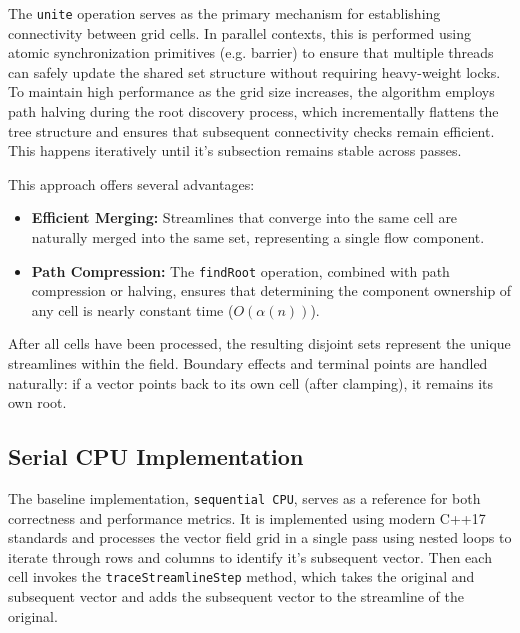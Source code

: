 The \texttt{unite} operation serves as the primary mechanism for establishing connectivity between grid cells.
In parallel contexts, this is performed using atomic synchronization primitives (e.g. barrier) to ensure that multiple threads can safely update the shared set structure without requiring heavy-weight locks.
To maintain high performance as the grid size increases, the algorithm employs path halving during the root discovery process, which incrementally flattens the tree structure and ensures that subsequent connectivity checks remain efficient.
This happens iteratively until it's subsection remains stable across passes.


This approach offers several advantages:
\begin{itemize}
	\item \textbf{Efficient Merging:} Streamlines that converge into the same cell are naturally merged into the same set, representing a single flow component.
	\item \textbf{Path Compression:} The \texttt{findRoot} operation, combined with path compression or halving, ensures that determining the component ownership of any cell is nearly constant time ($O(\alpha(n))$).
\end{itemize}

After all cells have been processed, the resulting disjoint sets represent the unique streamlines within the field.
Boundary effects and terminal points are handled naturally: if a vector points back to its own cell (after clamping), it remains its own root.

\subsection{Serial CPU Implementation}
The baseline implementation, \texttt{sequential CPU}, serves as a reference for both correctness and performance metrics.
It is implemented using modern C++17 standards and processes the vector field grid in a single pass using nested loops to iterate through rows and columns to identify it's subsequent vector.
Then each cell invokes the \texttt{traceStreamlineStep} method, which takes the original and subsequent vector and adds the subsequent vector to the streamline of the original.

